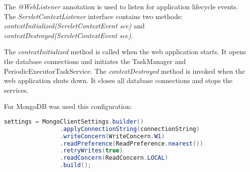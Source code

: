 \vspace{\baselineskip}

\sloppy
The \textit{@WebListener} annotation is used to listen for application lifecycle events. 
The \textit{ServletContextListener} interface contains two methods: \textit{contextInitialized(ServletContextEvent sce)} 
and \textit{contextDestroyed(ServletContextEvent sce)}. 

\vspace{\baselineskip}

The \textit{contextInitialized} method is called when the web application starts. It opens the database 
connections and initiates the TaskManager and PeriodicExecutorTaskService. The \textit{contextDestroyed} 
method is invoked when the web application shuts down. It closes all database connections and stops the services.

\vspace{\baselineskip}

For MongoDB was used this configuration:

\begin{mdframed}[backgroundcolor=yellow!20, innerleftmargin=10pt, innerrightmargin=10pt]
    \begin{lstlisting}[language=java]
    settings = MongoClientSettings.builder()
                .applyConnectionString(connectionString)
                .writeConcern(WriteConcern.W1)
                .readPreference(ReadPreference.nearest())
                .retryWrites(true)
                .readConcern(ReadConcern.LOCAL)
                .build();
    \end{lstlisting}
\end{mdframed}

